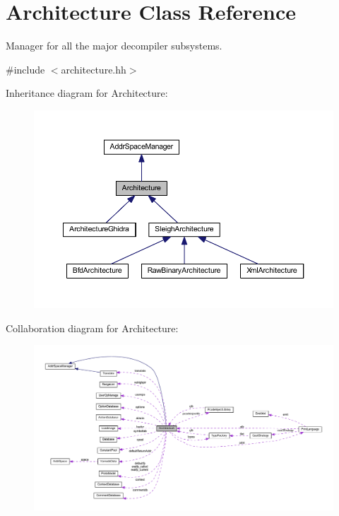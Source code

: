 \hypertarget{class_architecture}{}\section{Architecture Class Reference}
\label{class_architecture}


Manager for all the major decompiler subsystems.  




{\ttfamily \#include $<$architecture.\+hh$>$}



Inheritance diagram for Architecture\+:
\nopagebreak
\begin{figure}[H]
\begin{center}
\leavevmode
\includegraphics[width=350pt]{class_architecture__inherit__graph}
\end{center}
\end{figure}


Collaboration diagram for Architecture\+:
\nopagebreak
\begin{figure}[H]
\begin{center}
\leavevmode
\includegraphics[width=350pt]{class_architecture__coll__graph}
\end{center}
\end{figure}
